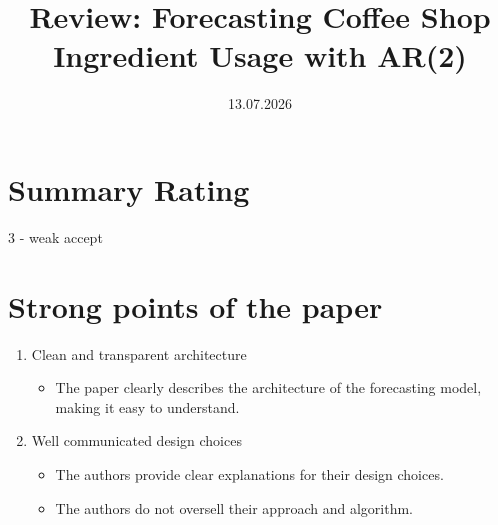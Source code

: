 \documentclass[peerreview]{IEEEtran}
\begin{document}
\title{Review: Forecasting Coffee Shop Ingredient Usage with AR(2)}


\date{13.07.2026}

\maketitle

\section{Summary Rating}
3 - weak accept 

\section{Strong points of the paper}
\begin{enumerate}
    \item Clean and transparent architecture
    \begin{itemize}
        \item The paper clearly describes the architecture of the forecasting model, making it easy to understand.
    \end{itemize}
    \item Well communicated design choices
    \begin{itemize}
        \item The authors provide clear explanations for their design choices.
        \item The authors do not oversell their approach and algorithm.
    \end{itemize}
\end{enumerate}
\end{document}
